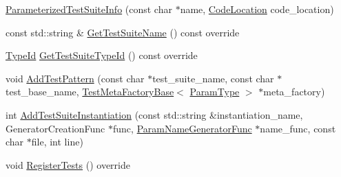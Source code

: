 \begin{DoxyCompactItemize}
\item 
\mbox{\hyperlink{classtesting_1_1internal_1_1_parameterized_test_suite_info_a56fc02ddec2cf2101332d1125e4c75a9}{Parameterized\+Test\+Suite\+Info}} (const char $\ast$name, \mbox{\hyperlink{structtesting_1_1internal_1_1_code_location}{Code\+Location}} code\+\_\+location)
\item 
const std\+::string \& \mbox{\hyperlink{classtesting_1_1internal_1_1_parameterized_test_suite_info_a4a5ddc2cd0404438c2b4d405cd0e706c}{Get\+Test\+Suite\+Name}} () const override
\item 
\mbox{\hyperlink{namespacetesting_1_1internal_a38c435cbab5f8b784e2e7f3356cab242}{Type\+Id}} \mbox{\hyperlink{classtesting_1_1internal_1_1_parameterized_test_suite_info_af488d1d7c1889a250acff2ea6eba4c84}{Get\+Test\+Suite\+Type\+Id}} () const override
\item 
void \mbox{\hyperlink{classtesting_1_1internal_1_1_parameterized_test_suite_info_a07445ac68713383f38747e1c56c6a04a}{Add\+Test\+Pattern}} (const char $\ast$test\+\_\+suite\+\_\+name, const char $\ast$test\+\_\+base\+\_\+name, \mbox{\hyperlink{classtesting_1_1internal_1_1_test_meta_factory_base}{Test\+Meta\+Factory\+Base}}$<$ \mbox{\hyperlink{classtesting_1_1internal_1_1_parameterized_test_suite_info_a10761bd750a6820a8d8d2c654b10fe54}{Param\+Type}} $>$ $\ast$meta\+\_\+factory)
\item 
int \mbox{\hyperlink{classtesting_1_1internal_1_1_parameterized_test_suite_info_a174f164f38e522a3935da911a9c1e450}{Add\+Test\+Suite\+Instantiation}} (const std\+::string \&instantiation\+\_\+name, Generator\+Creation\+Func $\ast$func, \mbox{\hyperlink{classtesting_1_1internal_1_1_parameterized_test_suite_info_a3b4f232b7d6d3df941bb8e81b6b534a4}{Param\+Name\+Generator\+Func}} $\ast$name\+\_\+func, const char $\ast$file, int line)
\item 
void \mbox{\hyperlink{classtesting_1_1internal_1_1_parameterized_test_suite_info_a8c0af866d3c291a63d3f4581ccd452d1}{Register\+Tests}} () override
\end{DoxyCompactItemize}
